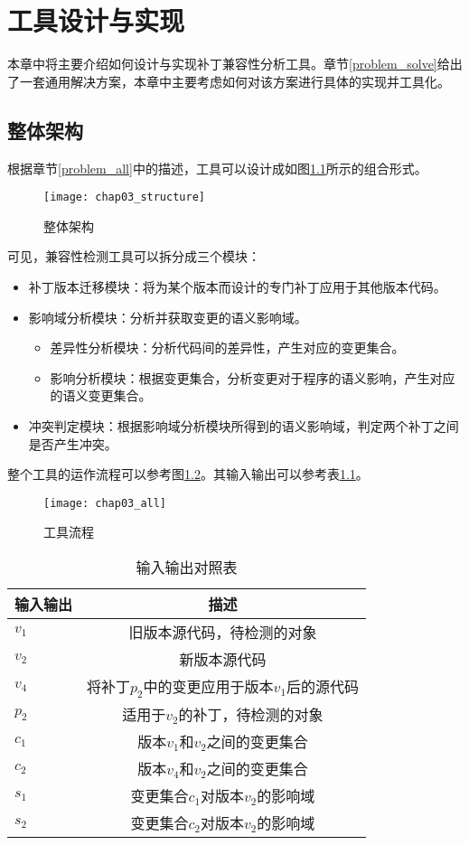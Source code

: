 \chapter{工具设计与实现}
本章中将主要介绍如何设计与实现补丁兼容性分析工具。章节\ref {problem_solve}给出了一套通用解决方案，本章中主要考虑如何对该方案进行具体的实现并工具化。

\section{整体架构}
\label {tool_struct}

根据章节\ref {problem_all}中的描述，工具可以设计成如图\ref {structure}所示的组合形式。

\begin{figure}[H]
	\centering
	\texttt{[image: chap03\_structure]}
	\caption {整体架构}	
	\label {structure}
\end{figure}

可见，兼容性检测工具可以拆分成三个模块：
\begin{itemize}
	\item 补丁版本迁移模块：将为某个版本而设计的专门补丁应用于其他版本代码。
	\item 影响域分析模块：分析并获取变更的语义影响域。
	\begin{itemize}
		\item 差异性分析模块：分析代码间的差异性，产生对应的变更集合。
		\item 影响分析模块：根据变更集合，分析变更对于程序的语义影响，产生对应的语义变更集合。
	\end{itemize}
	\item 冲突判定模块：根据影响域分析模块所得到的语义影响域，判定两个补丁之间是否产生冲突。
\end{itemize}

整个工具的运作流程可以参考图\ref {solution_all}。其输入输出可以参考表\ref {all_io2}。

\begin{figure}[H]
	\centering
	\texttt{[image: chap03\_all]}
	\caption {工具流程}
	\label {solution_all}	
\end{figure}

\begin{table}[H]
	\caption{输入输出对照表}
	\label{all_io2}
	\centering
	\begin{tabular}{lc}
		\toprule[1.5pt]
		{\heiti 输入输出} & {\heiti 描述}\\\midrule[1pt]
		$v_1$ & 旧版本源代码，待检测的对象 \\
		$v_2$ & 新版本源代码 \\
		$v_4$ & 将补丁$p_2$中的变更应用于版本$v_1$后的源代码 \\
		$p_2$ & 适用于$v_2$的补丁，待检测的对象 \\
		$c_1$ & 版本$v_1$和$v_2$之间的变更集合\\
		$c_2$ & 版本$v_4$和$v_2$之间的变更集合\\
		$s_1$ & 变更集合$c_1$对版本$v_2$的影响域 \\
		$s_2$ & 变更集合$c_2$对版本$v_2$的影响域 \\
		\bottomrule[1.5pt]
	\end{tabular}
\end{table}

